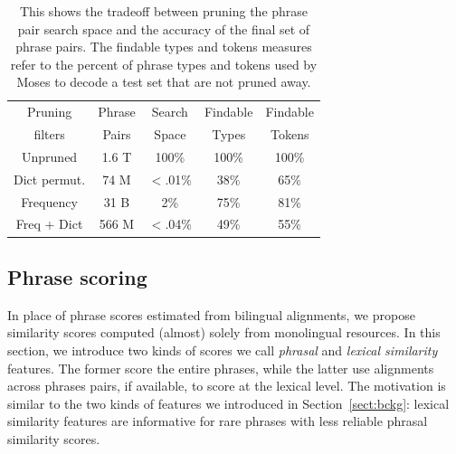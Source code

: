\documentclass[11pt]{article}
\newcommand{\todo}[1]{\textcolor{red}{TODO: #1}}
\newcommand{\secref}[1]{Section~\ref{#1}}
\begin{document}

\begin{table}
\small
\begin{center}
\begin{tabular}{|c|c|c|c|c|}
\hline
Pruning 	& Phrase	& Search & 	Findable 	& Findable \\
filters	& Pairs	&  Space & Types 	&  Tokens \\
\hline
Unpruned & 1.6 T & 100\% & 100\% & 100\% \\
Dict permut. & 74 M & $<$.01\% & 38\% & 65\% \\
Frequency &  31 B & 2\% & 75\% & 81\% \\
Freq + Dict & 566 M & $<$.04\% & 49\% & 55\% \\
\hline
\end{tabular}
\caption{This shows the tradeoff between pruning the phrase pair search space and the accuracy of the final set of phrase pairs. The findable types and tokens measures refer to the percent of phrase types and tokens used by Moses to decode a test set that are not pruned away. }\label{table:prune}
\end{center}
\end{table}



\subsection{Phrase scoring} \label{sect:score}

In place of phrase scores estimated from bilingual alignments, we propose similarity scores computed (almost) solely from monolingual resources.  In this section, we introduce two kinds of scores we call {\em phrasal} and {\em lexical similarity} features.  The former score the entire phrases, while the latter use alignments across phrases pairs, if available, to score at the lexical level.  The motivation is similar to the two kinds of features we introduced in \secref{sect:bckg}: lexical similarity features are informative for rare phrases with less reliable phrasal similarity scores.
\end{document}
